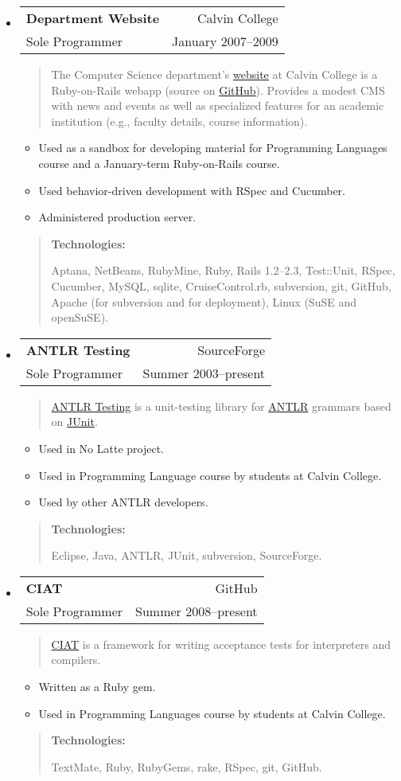 \documentclass[letterpaper,10pt]{article}
\makeatletter
\newcommand{\resitem}[1]{\item #1 \vspace{-2pt}}
\newcommand{\ressubheading}[4]{ 
\begin{tabular*}{7in}{l@{\extracolsep{\fill}}r}
	\textbf{#1} & #2 \\
	{#3} & {#4} \\
\end{tabular*}
\vspace{-6pt}}
\newenvironment{comment}{
\begin{quote}
}{
\end{quote}
}
\newenvironment{technologies}{
\begin{comment}
  \textbf{Technologies:}
}{
\end{comment}
}
\newenvironment{descriptio}{
\begin{comment}
}{
\end{comment}
}
\newenvironment{project}[4]{
\setlength{\parskip}{0pt}
\setlength{\topsep}{0pt}
\setlength{\itemsep}{0pt}
\setlength{\parsep}{0pt}
\setlength{\partopsep}{0pt}
\item \ressubheading{#1}{#2}{#3}{#4}
}{\medskip}
\makeatother
\begin{document}
\begin{itemize}
	\newpage
	
	\begin{project}{Department Website}{Calvin College}{Sole Programmer}{January 2007--2009}
	  \begin{descriptio}
	  	The Computer Science department's \href{http://cs.calvin.edu/}{website} at Calvin College is a Ruby-on-Rails webapp (source on \href{http://www.github.com/jdfrens/calvincs}{GitHub}).  Provides a modest CMS with news and events as well as specialized features for an academic institution (e.g., faculty details, course information).
	  \end{descriptio}
	  \begin{itemize}
	    \resitem{Used as a sandbox for developing material for Programming Languages course and a January-term Ruby-on-Rails course.}
	    \resitem{Used behavior-driven development with RSpec and Cucumber.}
	  	\resitem{Administered production server.}
	  \end{itemize}
	  \begin{technologies}
	    Aptana, NetBeans, RubyMine, Ruby, Rails 1.2--2.3, Test::Unit, RSpec, Cucumber, MySQL, sqlite, CruiseControl.rb, subversion, git, GitHub, Apache (for subversion and for deployment), Linux (SuSE and openSuSE).
	  \end{technologies}
	\end{project}

	\begin{project}{ANTLR Testing}{SourceForge}{Sole Programmer}{Summer 2003--present}
		\begin{descriptio}
			\href{http://antlr-testing.sourceforge.net/}{ANTLR Testing} is a unit-testing library for \href{http://www.antlr.org/}{ANTLR} grammars based on \href{http://junit.org/}{JUnit}.
		\end{descriptio}
		\begin{itemize}
			\resitem{Used in No Latte project.}
			\resitem{Used in Programming Language course by students at Calvin College.}
			\resitem{Used by other ANTLR developers.}
		\end{itemize}
		\begin{technologies}
		  Eclipse, Java, ANTLR, JUnit, subversion, SourceForge.
		\end{technologies}
	\end{project}
	
	\begin{project}{CIAT}{GitHub}{Sole Programmer}{Summer 2008--present}
	  \begin{descriptio}
	  	\href{http://jdfrens.github.com/ciat/}{CIAT} is a framework for writing acceptance tests for interpreters and compilers.
	  \end{descriptio}
	  \begin{itemize}
	  	\resitem{Written as a Ruby gem.}
			\resitem{Used in Programming Languages course by students at Calvin College.}
	  \end{itemize}
	  \begin{technologies}
	    TextMate, Ruby, RubyGems, rake, RSpec, git, GitHub.
	  \end{technologies}
	\end{project}


\end{itemize}
\end{document}
